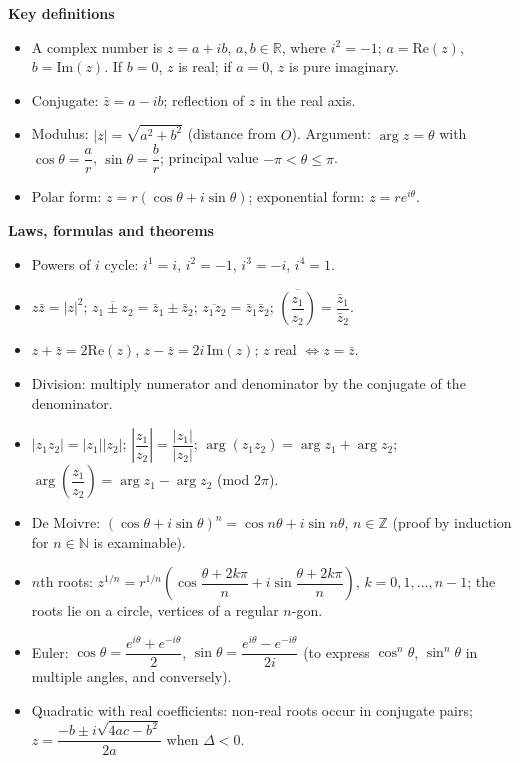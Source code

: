 \documentclass[11pt]{article}
\newcommand{\cle}[1]{{\popxbold\color{popdark}#1}}
\begin{document}
\begin{bilan}
\textbf{Key definitions}
\begin{itemize}
\item A \cle{complex number} is $z=a+ib$, $a,b\in\mathbb{R}$, where $i^2=-1$; $a=\mathrm{Re}(z)$, $b=\mathrm{Im}(z)$. If $b=0$, $z$ is real; if $a=0$, $z$ is pure imaginary.
\item \cle{Conjugate}: $\bar z=a-ib$; reflection of $z$ in the real axis.
\item \cle{Modulus}: $|z|=\sqrt{a^2+b^2}$ (distance from $O$). \cle{Argument}: $\arg z=\theta$ with $\cos\theta=\dfrac{a}{r}$, $\sin\theta=\dfrac{b}{r}$; principal value $-\pi<\theta\le\pi$.
\item \cle{Polar form}: $z=r(\cos\theta+i\sin\theta)$; \cle{exponential form}: $z=re^{i\theta}$.
\end{itemize}

\textbf{Laws, formulas and theorems}
\begin{itemize}
\item Powers of $i$ cycle: $i^1=i$, $i^2=-1$, $i^3=-i$, $i^4=1$.
\item $z\bar z=|z|^2$; $\overline{z_1\pm z_2}=\bar z_1\pm\bar z_2$; $\overline{z_1z_2}=\bar z_1\bar z_2$; $\overline{\left(\dfrac{z_1}{z_2}\right)}=\dfrac{\bar z_1}{\bar z_2}$.
\item $z+\bar z=2\mathrm{Re}(z)$, $z-\bar z=2i\,\mathrm{Im}(z)$; $z$ real $\iff z=\bar z$.
\item Division: multiply numerator and denominator by the conjugate of the denominator.
\item $|z_1z_2|=|z_1||z_2|$; $\left|\dfrac{z_1}{z_2}\right|=\dfrac{|z_1|}{|z_2|}$; $\arg(z_1z_2)=\arg z_1+\arg z_2$; $\arg\!\left(\dfrac{z_1}{z_2}\right)=\arg z_1-\arg z_2$ (mod $2\pi$).
\item \cle{De Moivre}: $(\cos\theta+i\sin\theta)^n=\cos n\theta+i\sin n\theta$, $n\in\mathbb{Z}$ (proof by induction for $n\in\mathbb{N}$ is examinable).
\item \cle{$n$th roots}: $z^{1/n}=r^{1/n}\!\left(\cos\dfrac{\theta+2k\pi}{n}+i\sin\dfrac{\theta+2k\pi}{n}\right)$, $k=0,1,\dots,n-1$; the roots lie on a circle, vertices of a regular $n$-gon.
\item Euler: $\cos\theta=\dfrac{e^{i\theta}+e^{-i\theta}}{2}$, $\sin\theta=\dfrac{e^{i\theta}-e^{-i\theta}}{2i}$ (to express $\cos^n\theta$, $\sin^n\theta$ in multiple angles, and conversely).
\item Quadratic with real coefficients: non-real roots occur in conjugate pairs; $z=\dfrac{-b\pm i\sqrt{4ac-b^2}}{2a}$ when $\Delta<0$.
\end{itemize}


\end{bilan}
\end{document}
